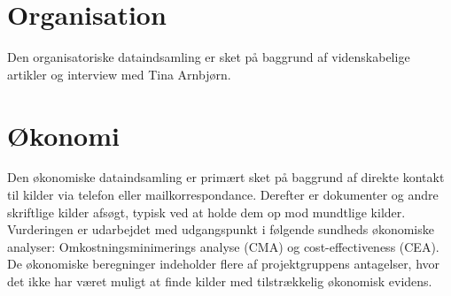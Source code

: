 \section{Organisation}
Den organisatoriske dataindsamling er sket på baggrund af videnskabelige artikler og interview med Tina Arnbjørn. 
\section{Økonomi}
Den økonomiske dataindsamling er primært sket på baggrund af direkte kontakt til kilder via telefon eller mailkorrespondance. Derefter er dokumenter og andre skriftlige kilder afsøgt, typisk ved at holde dem op mod mundtlige kilder. Vurderingen er udarbejdet med udgangspunkt i følgende sundheds økonomiske analyser: Omkostningsminimerings analyse (CMA) og cost-effectiveness (CEA). De økonomiske beregninger indeholder flere af projektgruppens antagelser, hvor det ikke har været muligt at finde kilder med tilstrækkelig økonomisk evidens. 